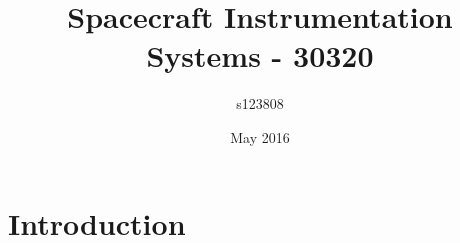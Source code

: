\documentclass{book}
\title{Spacecraft Instrumentation Systems - 30320}
\author{s123808 }
\date{May 2016}
\begin{document}
\maketitle

\section{Introduction}
\end{document}
